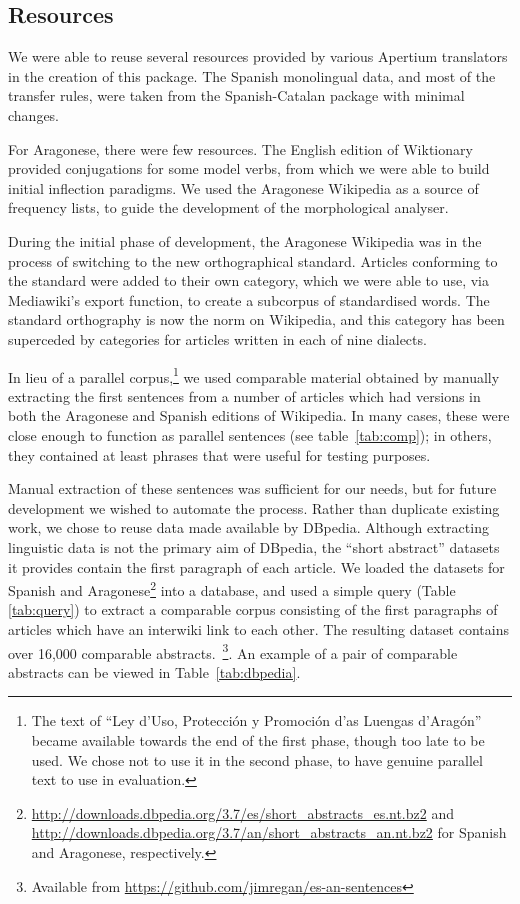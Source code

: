 \documentclass[10pt,a4paper,twocolumn]{article}
\begin{document}
  \subsection{Resources}
  
  We were able to reuse several resources provided by various Apertium translators in the creation of this package. The Spanish monolingual data, and most of the transfer rules, were taken from the Spanish-Catalan package with minimal changes. 
  
  For Aragonese, there were few resources. The English edition of Wiktionary provided conjugations for some model verbs, from which we were able to build initial inflection paradigms. We used the Aragonese Wikipedia as a source of frequency lists, to guide the development of the morphological analyser.
  
  During the initial phase of development, the Aragonese Wikipedia was in the process of switching to the new orthographical standard. Articles conforming to the standard were added to their own category, which we were able to use, via Mediawiki's export function, to create a subcorpus of standardised words. The standard orthography is now the norm on Wikipedia, and this category has been superceded by categories for articles written in each of nine dialects.
  
  In lieu of a parallel corpus,\footnote{The text of ``Ley d'Uso, Protección y Promoción d'as Luengas d'Aragón'' became available towards the end of the first phase, though too late to be used. We chose not to use it in the second phase, to have genuine parallel text to use in evaluation.} we used comparable material obtained by manually extracting the first sentences from a number of articles which had versions in both the Aragonese and Spanish editions of Wikipedia. In many cases, these were close enough to function as parallel sentences (see table~\ref{tab:comp}); in others, they contained at least phrases that were useful for testing purposes.
 
  Manual extraction of these sentences was sufficient for our needs, but for future development we wished to automate the process. Rather than duplicate existing work, we chose to reuse data made available by DBpedia\cite{DBpedia}. Although extracting linguistic data is not the primary aim of DBpedia, the ``short abstract'' datasets it provides contain the first paragraph of each article. We loaded the datasets for Spanish and Aragonese\footnote{\url{http://downloads.dbpedia.org/3.7/es/short_abstracts_es.nt.bz2} and \url{http://downloads.dbpedia.org/3.7/an/short_abstracts_an.nt.bz2} for Spanish and Aragonese, respectively.} into a database, and used a simple query (Table \ref{tab:query}) to extract a comparable corpus consisting of the first paragraphs of articles which have an interwiki link to each other. The resulting dataset contains over 16,000 comparable abstracts.~\footnote{Available from \url{https://github.com/jimregan/es-an-sentences}}. An example of a pair of comparable abstracts can be viewed in Table~\ref{tab:dbpedia}.
\end{document}
